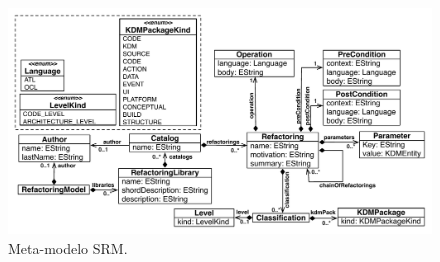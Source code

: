 \begin{figure}[h]
	\centering
	\includegraphics[scale=0.65]{images/refactoring_metamodel}
	\caption{Meta-modelo SRM.}
	\label{fig:meta_modelo_SRM}
\end{figure}

